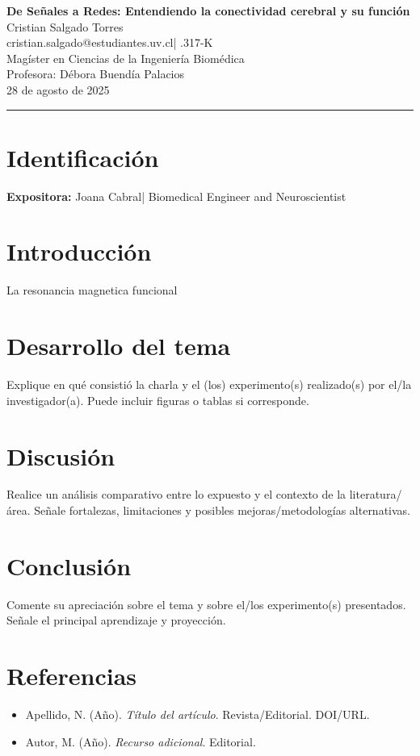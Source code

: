 \documentclass[11pt]{article}
\makeatletter
\newcommand{\titulodeltrabajo}{De Señales a Redes: Entendiendo la conectividad cerebral y su función}
\newcommand{\autor}{Cristian Salgado Torres}
\newcommand{\correo}{cristian.salgado@estudiantes.uv.cl}
\newcommand{\rut}{20.973.317-K}
\newcommand{\curso}{Magíster en Ciencias de la Ingeniería Biomédica}
\newcommand{\profesora}{Débora Buendía Palacios}
\newcommand{\fechaentrega}{28 de agosto de 2025}
\newcommand{\expositor}{Joana Cabral}
\makeatother
\begin{document}
\begin{center}
  {\LARGE \textbf{\titulodeltrabajo}}\\[8pt]
  {\large \autor}\\[2pt]
  \correo \quad | \quad \rut\\[6pt]
  \curso\\
  Profesora: \profesora\\
  \fechaentrega
\end{center}

\vspace{0.8em}
\hrule height 0.4pt
\vspace{0.8em}

\section*{Identificación}
\textbf{Expositora:} \expositor \quad | \quad
Biomedical Engineer and Neuroscientist

\section*{Introducción}
La resonancia magnetica funcional

\section*{Desarrollo del tema}
Explique en qué consistió la charla y el (los) experimento(s) realizado(s) por el/la investigador(a). Puede incluir figuras o tablas si corresponde.

\section*{Discusión}
Realice un análisis comparativo entre lo expuesto y el contexto de la literatura/área. Señale fortalezas, limitaciones y posibles mejoras/metodologías alternativas.

\section*{Conclusión}
Comente su apreciación sobre el tema y sobre el/los experimento(s) presentados. Señale el principal aprendizaje y proyección.

\section*{Referencias}
\begin{itemize}[leftmargin=0.7cm,itemsep=2pt]
  \item Apellido, N. (Año). \textit{Título del artículo}. Revista/Editorial. DOI/URL.
  \item Autor, M. (Año). \textit{Recurso adicional}. Editorial.
\end{itemize}
\end{document}
